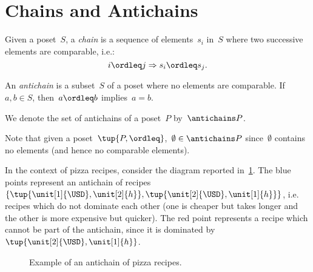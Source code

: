 

\section{Chains and Antichains}\label{sec:chains-antichains}

\begin{definition}
    \label{def:chain}
    Given a poset~$S$, a \emph{chain} is a sequence of elements~${s_i}$ in~$S$ where two successive elements are comparable, i.e.:
    \begin{equation}
        i \ordleq j \Rightarrow s_i \ordleq s_j.
    \end{equation}
\end{definition}

\begin{definition}
    \label{def:antichain}
    An \emph{antichain} is a subset~$S$ of a poset where no elements are comparable. If~$a,b \in S$, then~$a \ordleq b$ implies~$a=b$.
\end{definition}
\begin{remark}
    We denote the set of antichains of a poset~$P$ by~$\antichains P$.
\end{remark}
\begin{remark}
    Note that given a poset~$\tup{P,\ordleq}$,~$\emptyset \in \antichains P$ since~$\emptyset$ contains no elements (and hence no comparable elements).
\end{remark}

In the context of pizza recipes, consider the diagram reported in~\cref{fig:antichain}. The blue points represent an antichain of recipes~$\{\tup{\unit[1]{\USD},\unit[2]{h}},\tup{\unit[2]{\USD},\unit[1]{h}}\}$, i.e. recipes which do not dominate each other (one is cheaper but takes longer and the other is more expensive but quicker). The red point represents a recipe which cannot be part of the antichain, since it is dominated by~$\tup{\unit[2]{\USD},\unit[1]{h}}$.

\begin{figure}[h!]
    \begin{center}
    \end{center}
    \caption{Example of an antichain of pizza recipes. \label{fig:antichain}}
\end{figure}


